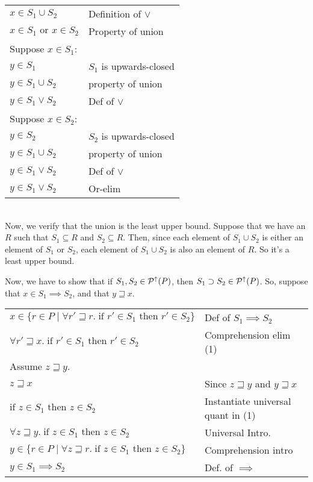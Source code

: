 \begin{tabular}{ll}
$x \in S_1 \cup S_2$               & Definition of $\vee$ \\
$x \in S_1 \mbox{ or } x \in S_2$  & Property of union \\
Suppose $x \in S_1$:               & \\
\qquad $y \in S_1$                 & $S_1$ is upwards-closed \\
\qquad $y \in S_1 \cup S_2$        & property of union \\
\qquad $y \in S_1 \vee S_2$        & Def of $\vee$ \\
Suppose $x \in S_2$:               & \\
\qquad $y \in S_2$                 & $S_2$ is upwards-closed \\
\qquad $y \in S_1 \cup S_2$        & property of union \\
\qquad $y \in S_1 \vee S_2$        & Def of $\vee$ \\
$y \in S_1 \vee S_2$               & Or-elim \\
\end{tabular}
\\

Now, we verify that the union is the least upper bound. Suppose that
we have an $R$ such that $S_1 \subseteq R$ and $S_2 \subseteq R$. Then,
since each element of $S_1 \cup S_2$ is either an element of $S_1$
or $S_2$, each element of $S_1 \cup S_2$ is also an element of $R$. So
it's a least upper bound. 

Now, we have to show that if $S_1, S_2 \in \mathcal{P}^{\uparrow}({P})$, then
$S_1 \supset S_2 \in \mathcal{P}^{\uparrow}({P})$. So, suppose that 
$x \in S_1 \implies S_2$, and that $y \sqsupseteq x$. 
\\

\begin{tabular}{ll}
$x \in \{ r \in P \;|\; \forall r' \sqsupseteq r.\; 	
                          \mbox{if } r' \in S_1 \mbox{ then } r' \in S_2 \}$ &
Def of $S_1 \implies S_2$ \\

$\forall r' \sqsupseteq x.\; 	
    \mbox{if } r' \in S_1 \mbox{ then } r' \in S_2$ &
Comprehension elim (1)
\\

Assume $z \sqsupseteq y$. & \\

\qquad $z \sqsupseteq x$ & 
Since $z \sqsupseteq y$ and $y \sqsupseteq x$ \\

\qquad $\mbox{if } z \in S_1 \mbox{ then } z \in S_2$
& Instantiate universal quant in (1) \\

$\forall z \sqsupseteq y.\; 	
\mbox{if } z \in S_1 \mbox{ then } z \in S_2$ &
Universal Intro. \\

$y \in \{ r \in P \;|\; \forall z \sqsupseteq r.\; 	
                          \mbox{if } z \in S_1 \mbox{ then } z \in S_2 \}$ &
Comprehension intro \\

$y \in S_1 \implies S_2$ 
& Def. of $\implies$ \\
\end{tabular}

